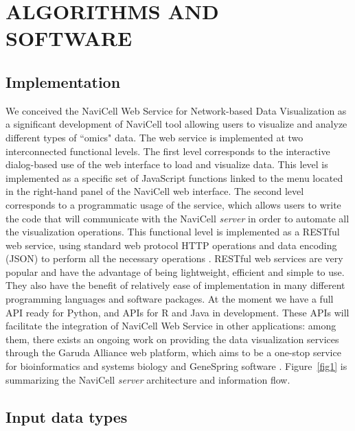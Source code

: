\documentclass[a4,center,fleqn]{NAR}
\begin{document}
\section{ALGORITHMS AND SOFTWARE}

\subsection{Implementation}

We conceived the NaviCell Web Service for Network-based Data Visualization
as a significant development of NaviCell tool \cite{kuperstein2013navicell} allowing
users to visualize and analyze different types of ``omics" data. The web service
is implemented at two interconnected functional levels.
The first level corresponds to the interactive dialog-based
use of the web interface to load and visualize data. This level is implemented
as a specific set of JavaScript functions linked to the menu located
in the right-hand panel of the NaviCell web interface. The second level corresponds to a
programmatic usage of the service, which allows users to write the code that will
communicate with the NaviCell \emph{server} in order to automate all the
visualization operations. This functional level is implemented as a RESTful web
service, using standard web protocol HTTP operations and data encoding (JSON)
to perform all the necessary operations \cite{fielding2002principled}.
RESTful web services are very popular and have the advantage of being
lightweight, efficient and simple to use. They also have the benefit of
relatively ease of implementation in many different programming languages and
software packages. At the moment we have a full API ready for Python, and
APIs for R and Java in development. These APIs will facilitate the
integration of NaviCell Web Service in other applications: among them, there exists an ongoing work on providing
the data visualization services through the Garuda Alliance web platform, which aims to be a one-stop service for
bioinformatics and systems biology \cite{ghosh2011software} and GeneSpring software \cite{XXX}. Figure~\ref{fig1} is
summarizing the NaviCell \emph{server} architecture and information flow.

\enlargethispage{-65.1pt}

\subsection{Input data types}
\end{document}
